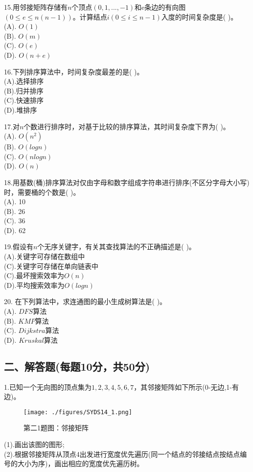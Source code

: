 15.用邻接矩阵存储有$n$个顶点$(0,1,...,-1)$和e条边的有向图$(0\leqslant e\leqslant n(n-1))$。计算结点$i(0\leqslant i\leqslant n-1)$入度的时间复杂度是( )。 \\
(A). $O(1)$ \\
(B). $O(m)$ \\
(C). $O(e)$ \\
(D). $O(n+e)$

16.下列排序算法中，时间复杂度最差的是( )。 \\
(A).选择排序 \\
(B).归并排序 \\
(C).快速排序 \\
(D).堆排序

17.对$n$个数进行排序时，对基于比较的排序算法，其时间复杂度下界为( )。 \\
(A). $O(n^2)$ \\
(B). $O(logn)$ \\
(C). $O(nlogn)$ \\
(D). $O(n)$

18.用基数(桶)排序算法对仅由字母和数字组成字符串进行排序(不区分字母大小写)时，需要桶的个数是( )。 \\
(A). 10 \\
(B). 26 \\
(C). 36 \\
(D). 62

19.假设有$n$个无序关键字，有关其查找算法的不正确描述是( )。 \\
(A).关键字可存储在数组中 \\
(C).关键字可存储在单向链表中 \\
(C).最坏搜索效率为$O(n)$ \\
(D).平均搜索效率为$O(logn)$

20. 在下列算法中，求连通图的最小生成树算法是( )。 \\
(A). $DFS$算法 \\
(B). $KMP$算法 \\
(C). $Dijkstra$算法 \\
(D). $Kruskal$算法

\subsection{二、解答题(每题10分，共50分)}
1.已知一个无向图的顶点集为${1,2,3,4,5,6,7}$，其邻接矩阵如下所示(0-无边,1-有边)。
\begin{figure}[ht]
\centering
\texttt{[image: ./figures/SYDS14\_1.png]}
\caption{第二1题图：邻接矩阵} \label{SYDS14_fig1}
\end{figure}
(1).画出该图的图形; \\
(2).根据邻接矩阵从顶点4出发进行宽度优先遍历(同一个结点的邻接结点按结点编号的大小为序)，画出相应的宽度优先遍历树。

